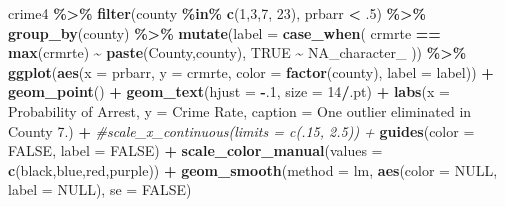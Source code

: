 \documentclass[
]{article}
\newenvironment{Shaded}{\begin{snugshade}}{\end{snugshade}}
\newcommand{\AttributeTok}[1]{\textcolor[rgb]{0.13,0.29,0.53}{#1}}
\newcommand{\CommentTok}[1]{\textcolor[rgb]{0.56,0.35,0.01}{\textit{#1}}}
\newcommand{\ConstantTok}[1]{\textcolor[rgb]{0.56,0.35,0.01}{#1}}
\newcommand{\DecValTok}[1]{\textcolor[rgb]{0.00,0.00,0.81}{#1}}
\newcommand{\FunctionTok}[1]{\textcolor[rgb]{0.13,0.29,0.53}{\textbf{#1}}}
\newcommand{\NormalTok}[1]{#1}
\newcommand{\SpecialCharTok}[1]{\textcolor[rgb]{0.81,0.36,0.00}{\textbf{#1}}}
\newcommand{\StringTok}[1]{\textcolor[rgb]{0.31,0.60,0.02}{#1}}
\begin{document}
\begin{Shaded}
\begin{Highlighting}[]
\NormalTok{crime4 }\SpecialCharTok{\%\textgreater{}\%} 
  \FunctionTok{filter}\NormalTok{(county }\SpecialCharTok{\%in\%} \FunctionTok{c}\NormalTok{(}\DecValTok{1}\NormalTok{,}\DecValTok{3}\NormalTok{,}\DecValTok{7}\NormalTok{, }\DecValTok{23}\NormalTok{),}
\NormalTok{         prbarr }\SpecialCharTok{\textless{}}\NormalTok{ .}\DecValTok{5}\NormalTok{) }\SpecialCharTok{\%\textgreater{}\%}
  \FunctionTok{group\_by}\NormalTok{(county) }\SpecialCharTok{\%\textgreater{}\%}
  \FunctionTok{mutate}\NormalTok{(}\AttributeTok{label =} \FunctionTok{case\_when}\NormalTok{(}
\NormalTok{    crmrte }\SpecialCharTok{==} \FunctionTok{max}\NormalTok{(crmrte) }\SpecialCharTok{\textasciitilde{}} \FunctionTok{paste}\NormalTok{(}\StringTok{\textquotesingle{}County\textquotesingle{}}\NormalTok{,county),}
    \ConstantTok{TRUE} \SpecialCharTok{\textasciitilde{}} \ConstantTok{NA\_character\_}
\NormalTok{  )) }\SpecialCharTok{\%\textgreater{}\%}
  \FunctionTok{ggplot}\NormalTok{(}\FunctionTok{aes}\NormalTok{(}\AttributeTok{x =}\NormalTok{  prbarr, }\AttributeTok{y =}\NormalTok{ crmrte, }\AttributeTok{color =} \FunctionTok{factor}\NormalTok{(county), }\AttributeTok{label =}\NormalTok{ label)) }\SpecialCharTok{+} 
  \FunctionTok{geom\_point}\NormalTok{() }\SpecialCharTok{+} 
  \FunctionTok{geom\_text}\NormalTok{(}\AttributeTok{hjust =} \SpecialCharTok{{-}}\NormalTok{.}\DecValTok{1}\NormalTok{, }\AttributeTok{size =} \DecValTok{14}\SpecialCharTok{/}\NormalTok{.pt) }\SpecialCharTok{+} 
  \FunctionTok{labs}\NormalTok{(}\AttributeTok{x =} \StringTok{\textquotesingle{}Probability of Arrest\textquotesingle{}}\NormalTok{, }
       \AttributeTok{y =} \StringTok{\textquotesingle{}Crime Rate\textquotesingle{}}\NormalTok{,}
       \AttributeTok{caption =} \StringTok{\textquotesingle{}One outlier eliminated in County 7.\textquotesingle{}}\NormalTok{) }\SpecialCharTok{+} 
  \CommentTok{\#scale\_x\_continuous(limits = c(.15, 2.5)) + }
  \FunctionTok{guides}\NormalTok{(}\AttributeTok{color =} \ConstantTok{FALSE}\NormalTok{, }\AttributeTok{label =} \ConstantTok{FALSE}\NormalTok{) }\SpecialCharTok{+} 
  \FunctionTok{scale\_color\_manual}\NormalTok{(}\AttributeTok{values =} \FunctionTok{c}\NormalTok{(}\StringTok{\textquotesingle{}black\textquotesingle{}}\NormalTok{,}\StringTok{\textquotesingle{}blue\textquotesingle{}}\NormalTok{,}\StringTok{\textquotesingle{}red\textquotesingle{}}\NormalTok{,}\StringTok{\textquotesingle{}purple\textquotesingle{}}\NormalTok{)) }\SpecialCharTok{+} 
  \FunctionTok{geom\_smooth}\NormalTok{(}\AttributeTok{method =} \StringTok{\textquotesingle{}lm\textquotesingle{}}\NormalTok{, }\FunctionTok{aes}\NormalTok{(}\AttributeTok{color =} \ConstantTok{NULL}\NormalTok{, }\AttributeTok{label =} \ConstantTok{NULL}\NormalTok{), }\AttributeTok{se =} \ConstantTok{FALSE}\NormalTok{)}
\end{Highlighting}
\end{Shaded}
\end{document}
